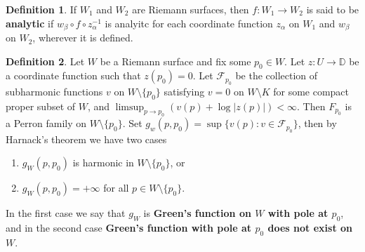 \documentclass[12pt]{article}
\theoremstyle{definition}
\newtheorem{definition}{Definition}
\newcommand{\D}{\mathbb{D}}      %
\begin{document}
\begin{definition}
    If $W_1$ and $W_2$ are Riemann surfaces, then $f:W_1\to W_2$ is said to be \textbf{analytic} if $w_\beta\circ f\circ z_\alpha^{-1}$ is analyitc for each coordinate function $z_\alpha$ on $W_1$ and $w_\beta$ on $W_2$, wherever it is defined.
\end{definition}

\begin{definition}
    Let $W$ be a Riemann surface and fix some $p_0\in W$. Let $z:U\to \D$ be a coordinate function such that $z(p_0)=0$. Let $\mathcal{F}_{p_0}$ be the collection of subharmonic functions $v$ on $W\setminus\{p_0\}$ satisfying $v=0$ on $W\setminus K$ for some compact proper subset of $W$, and $\limsup_{p\to p_0} (v(p)+\log|z(p)|)<\infty$. Then $F_{p_0}$ is a Perron family on $W\setminus\{p_0\}$. Set $g_w(p,p_0)=\sup\{v(p):v\in\mathcal{F}_{p_0}\}$, then by Harnack's theorem we have two cases
    \begin{enumerate}[label=(\roman*)]
        \item $g_W(p,p_0)$ is harmonic in $W\setminus\{p_0\}$, or
        \item $g_W(p,p_0)=+\infty$ for all $p\in W\setminus\{p_0\}$.
    \end{enumerate}
    In the first case we say that $g_W$ is \textbf{Green's function on $W$ with pole at $p_0$}, and in the second case \textbf{Green's function with pole at $p_0$ does not exist on $W$}.
\end{definition}
\end{document}

